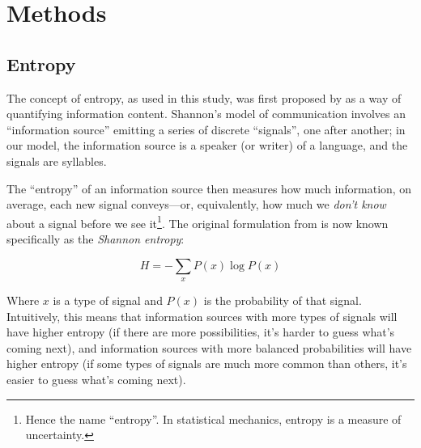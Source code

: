 \documentclass[12pt,twoside]{article}
\begin{document}



\section{Methods}
\label{sec:meth}

\subsection{Entropy}
\label{subsec:entropy}

The concept of entropy, as used in this study, was first proposed by \citet{shannon} as a way of quantifying information content. Shannon's model of communication involves an ``information source'' emitting a series of discrete ``signals'', one after another; in our model, the information source is a speaker (or writer) of a language, and the signals are syllables.

The ``entropy'' of an information source then measures how much information, on average, each new signal conveys---or, equivalently, how much we \emph{don't know} about a signal before we see it\footnote{Hence the name ``entropy''. In statistical mechanics, entropy is a measure of uncertainty.}. The original formulation from \citet[50]{shannon} is now known specifically as the \emph{Shannon entropy}:

\begin{equation}
\label{eqn:shannon}
H = - \sum_x P(x) \log P(x)
\end{equation}

Where \(x\) is a type of signal and \(P(x)\) is the probability of that signal. Intuitively, this means that information sources with more types of signals will have higher entropy (if there are more possibilities, it's harder to guess what's coming next), and information sources with more balanced probabilities will have higher entropy (if some types of signals are much more common than others, it's easier to guess what's coming next).
\end{document}

